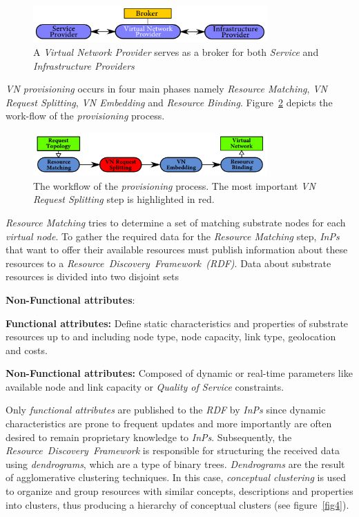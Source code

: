 \documentclass[prodmode,acmtomccap]{acmlarge}
\begin{document}
\begin{figure}[htb]
	\centering
	\includegraphics[width=0.8\textwidth]{broker}
	\caption{A \emph{Virtual Network Provider} serves as a broker for  both \emph{Service} and \emph{Infrastructure Providers}}
	\label{fig2}
\end{figure}

\emph{VN provisioning} occurs in four main phases namely \emph{Resource Matching}, \emph{VN Request Splitting}, \emph{VN Embedding} and \emph{Resource Binding}.
Figure~\ref{fig3} depicts the work-flow of the \emph{provisioning} process.

\begin{figure}[htb]
	\centering
	\includegraphics[width=0.8\textwidth]{provisioning2}
	\caption{The workflow of the \emph{provisioning} process. The most important \emph{VN Request Splitting} step is highlighted in red.}
	\label{fig3}
\end{figure}

\emph{Resource Matching} tries to determine a set of matching substrate nodes for each \emph{virtual node}.
To gather the required data for the  \emph{Resource Matching} step, \emph{InPs} that want to offer their available resources must publish information about these resources
to a \emph{Resource~Discovery~Framework~(RDF)}. Data about substrate resources is divided into two disjoint sets

\begin{describe}{{\bfseries Non-Functional attributes\/}:}
	\item[\bfseries Functional attributes:] Define static characteristics and properties of substrate resources up to and including node type, node capacity, link type, geolocation and costs.
	\item[\bfseries Non-Functional attributes:] Composed of dynamic or real-time parameters like available node and link capacity or \emph{Quality of Service} constraints.
\end{describe}

Only \emph{functional attributes} are published to the \emph{RDF} by \emph{InPs} since dynamic characteristics are prone to frequent updates and more importantly
are often desired to remain proprietary knowledge to \emph{InPs}. Subsequently, the \emph{Resource~Discovery~Framework} is responsible for structuring the received data
using \emph{dendrograms}, which are a type of binary trees. \emph{Dendrograms} are the result of agglomerative clustering techniques. In this case, \emph{conceptual clustering}
is used to organize and group resources with similar concepts, descriptions and properties into clusters, thus producing a hierarchy of conceptual clusters (see figure~\ref{fig4}).
\end{document}
